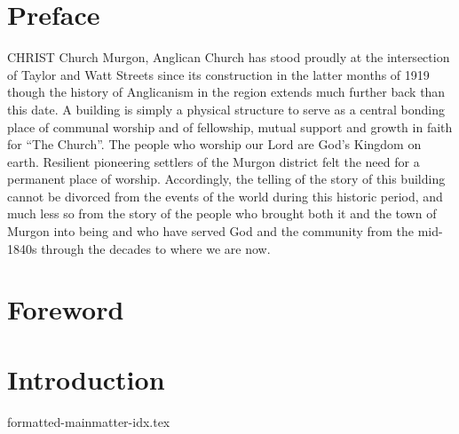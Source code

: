 \documentclass[a4paper,11pt,parskip=never,DIV=8,chapterprefix=true,titlepage=true,twoside,twocolumn,open=any]{scrbook}
\begin{document}
\chapter{Preface}

\lettrine[lines=3]{C}{HRIST} Church Murgon, Anglican Church has stood proudly at the intersection of
Taylor and Watt Streets since its construction in the latter months of 1919 though
the history of Anglicanism in the region extends much further back than this date.
A building is simply a physical structure to serve as a central bonding place of
communal worship and of fellowship, mutual support and growth in faith for ``The Church''.
The people who worship our Lord are God's Kingdom on earth.
Resilient pioneering settlers of the Murgon district felt the need for a permanent place of
worship.  Accordingly, the telling of the story of this building cannot be divorced from
the events of the world during this historic period, and much less so from the story of
the people who brought both it and the town of Murgon into being and who have served
God and the community from the mid-1840s through the decades to where we are now.

\chapter{Foreword}
\blindtext

\twocolumn

\mainmatter
\setcounter{page}{1}

\chapter{Introduction}
\blindtext

{formatted-mainmatter-idx.tex}

\printindex
\end{document}
